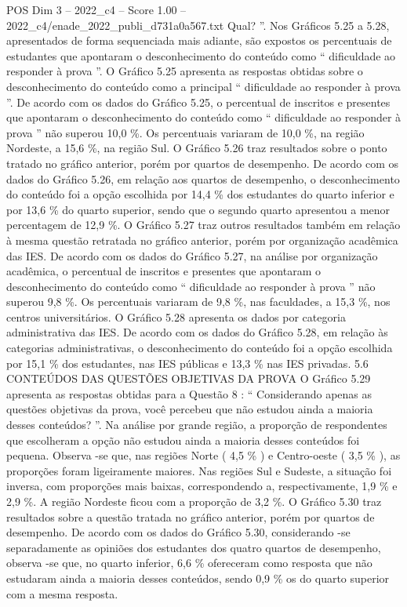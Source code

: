 \begin{textsample}{POS Dim 3 – 2022\_c4 – Score 1.00 – 2022\_c4/enade\_2022\_publi\_d731a0a567.txt}
Qual? ”.
Nos Gráficos 5.25 a 5.28, apresentados de forma sequenciada mais adiante, são expostos os percentuais de estudantes que apontaram o desconhecimento do conteúdo como “ dificuldade ao responder à prova ”.
O Gráfico 5.25 apresenta as respostas obtidas sobre o desconhecimento do conteúdo como a principal “ dificuldade ao responder à prova ”.
De acordo com os dados do Gráfico 5.25, o percentual de inscritos e presentes que apontaram o desconhecimento do conteúdo como “ dificuldade ao responder à prova ” não superou 10,0 \%.
Os percentuais variaram de 10,0 \%, na região Nordeste, a 15,6 \%, na região Sul.
O Gráfico 5.26 traz resultados sobre o ponto tratado no gráfico anterior, porém por quartos de desempenho.
De acordo com os dados do Gráfico 5.26, em relação aos quartos de desempenho, o desconhecimento do conteúdo foi a opção escolhida por 14,4 \% dos estudantes do quarto inferior e por 13,6 \% do quarto superior, sendo que o segundo quarto apresentou a menor percentagem de 12,9 \%.
O Gráfico 5.27 traz outros resultados também em relação à mesma questão retratada no gráfico anterior, porém por organização acadêmica das IES.
De acordo com os dados do Gráfico 5.27, na análise por organização acadêmica, o percentual de inscritos e presentes que apontaram o desconhecimento do conteúdo como “ dificuldade ao responder à prova ” não superou 9,8 \%.
Os percentuais variaram de 9,8 \%, nas faculdades, a 15,3 \%, nos centros universitários.
O Gráfico 5.28 apresenta os dados por categoria administrativa das IES.
De acordo com os dados do Gráfico 5.28, em relação às categorias administrativas, o desconhecimento do conteúdo foi a opção escolhida por 15,1 \% dos estudantes, nas IES públicas e 13,3 \% nas IES privadas. 5.6 CONTEÚDOS DAS QUESTÕES OBJETIVAS DA PROVA O Gráfico 5.29 apresenta as respostas obtidas para a Questão 8 : “ Considerando apenas as questões objetivas da prova, você percebeu que não estudou ainda a maioria desses conteúdos? ”.
Na análise por grande região, a proporção de respondentes que escolheram a opção não estudou ainda a maioria desses conteúdos foi pequena.
Observa -se que, nas regiões Norte ( 4,5 \% ) e Centro-oeste ( 3,5 \% ), as proporções foram ligeiramente maiores.
Nas regiões Sul e Sudeste, a situação foi inversa, com proporções mais baixas, correspondendo a, respectivamente, 1,9 \% e 2,9 \%.
A região Nordeste ficou com a proporção de 3,2 \%.
O Gráfico 5.30 traz resultados sobre a questão tratada no gráfico anterior, porém por quartos de desempenho.
De acordo com os dados do Gráfico 5.30, considerando -se separadamente as opiniões dos estudantes dos quatro quartos de desempenho, observa -se que, no quarto inferior, 6,6 \% ofereceram como resposta que não estudaram ainda a maioria desses conteúdos, sendo 0,9 \% os do quarto superior com a mesma resposta.

\end{textsample}
